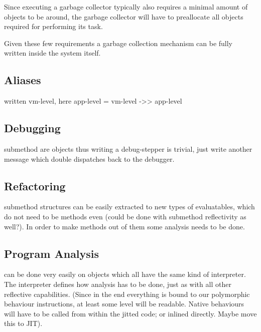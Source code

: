 \documentclass{article}
\begin{document}
Since executing a garbage collector typically also requires a minimal
amount of objects to be around, the garbage collector will have to
preallocate all objects required for performing its task.

Given these few requirements a garbage collection mechanism can be
fully written inside the system itself. 

\subsection{Aliases}
written vm-level, here app-level = vm-level ->> app-level

\subsection{Debugging}
submethod are objects thus writing a debug-stepper is trivial, just
write another message which double dispatches back to the debugger.

\subsection{Refactoring}
submethod structures can be easily extracted to new types of
evaluatables, which do not need to be methods even (could be done with
submethod reflectivity as well?). In order to make methods out of them
some analysis needs to be done.

\subsection{Program Analysis}
can be done very easily on objects which all have the same kind of
interpreter. The interpreter defines how analysis has to be done, just
as with all other reflective capabilities. (Since in the end everything
is bound to our polymorphic behaviour instructions, at least some
level will be readable. Native behaviours will have to be called from
within the jitted code; or inlined directly. Maybe move this to JIT).
\end{document}
